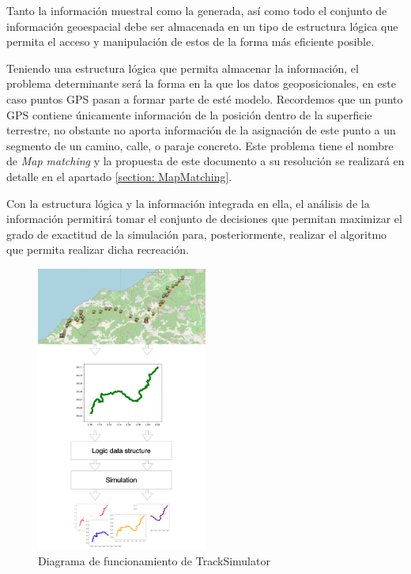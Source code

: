 Tanto la información muestral como la generada, así como todo el conjunto de información geoespacial debe 
ser almacenada en un tipo de estructura lógica que permita el acceso y manipulación de estos de la forma 
más eficiente posible. 

Teniendo una estructura lógica que permita almacenar la información, el problema determinante será la 
forma en la que los datos geoposicionales, en este caso puntos \ac{GPS} pasan a formar parte de esté 
modelo. Recordemos que un punto \ac{GPS} contiene únicamente información de la posición dentro de la
superficie terrestre, no obstante no aporta información de la asignación de este punto a un segmento de
un camino, calle, o paraje concreto. Este problema tiene el nombre de \textit{Map matching} y la propuesta
de este documento a su resolución se realizará en detalle en el apartado \ref{section: MapMatching}.

Con la estructura lógica y la información integrada en ella, el análisis de la información permitirá tomar 
el conjunto de decisiones que permitan maximizar el grado de exactitud de la simulación para, 
posteriormente, realizar el algoritmo que permita realizar dicha recreación.

\begin{figure}[H]
\begin{center}
\includegraphics[width=0.5\textwidth]{./Imagenes/TrackSimulatorStructure.png}
\caption{Diagrama de funcionamiento de TrackSimulator}
\label{TrackSimulatorDiagram}
\end{center}
\end{figure}
 
